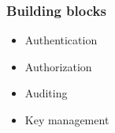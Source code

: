 \begin{frame}
  \frametitle{Building blocks}
  \begin{itemize}[<+- | alert@+>]
  \item Authentication
 \item Authorization
	\item Auditing
	\item Key management
  \end{itemize}
\end{frame}


